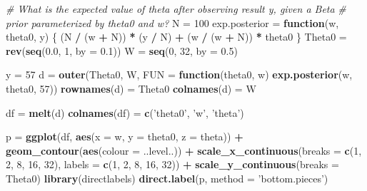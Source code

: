 \documentclass[]{article}
\newenvironment{Shaded}{\begin{snugshade}}{\end{snugshade}}
\newcommand{\CommentTok}[1]{\textcolor[rgb]{0.56,0.35,0.01}{\textit{#1}}}
\newcommand{\ControlFlowTok}[1]{\textcolor[rgb]{0.13,0.29,0.53}{\textbf{#1}}}
\newcommand{\DataTypeTok}[1]{\textcolor[rgb]{0.13,0.29,0.53}{#1}}
\newcommand{\DecValTok}[1]{\textcolor[rgb]{0.00,0.00,0.81}{#1}}
\newcommand{\FloatTok}[1]{\textcolor[rgb]{0.00,0.00,0.81}{#1}}
\newcommand{\KeywordTok}[1]{\textcolor[rgb]{0.13,0.29,0.53}{\textbf{#1}}}
\newcommand{\NormalTok}[1]{#1}
\newcommand{\OperatorTok}[1]{\textcolor[rgb]{0.81,0.36,0.00}{\textbf{#1}}}
\newcommand{\StringTok}[1]{\textcolor[rgb]{0.31,0.60,0.02}{#1}}
\begin{document}
\begin{Shaded}
\begin{Highlighting}[]
\CommentTok{# What is the expected value of theta after observing result y, given a Beta}
\CommentTok{# prior parameterized by theta0 and w?}
\NormalTok{N =}\StringTok{ }\DecValTok{100}
\NormalTok{exp.posterior =}\StringTok{ }\ControlFlowTok{function}\NormalTok{(w, theta0, y) \{}
\NormalTok{  (N }\OperatorTok{/}\StringTok{ }\NormalTok{(w }\OperatorTok{+}\StringTok{ }\NormalTok{N)) }\OperatorTok{*}\StringTok{ }\NormalTok{(y }\OperatorTok{/}\StringTok{ }\NormalTok{N) }\OperatorTok{+}\StringTok{ }\NormalTok{(w }\OperatorTok{/}\StringTok{ }\NormalTok{(w }\OperatorTok{+}\StringTok{ }\NormalTok{N)) }\OperatorTok{*}\StringTok{ }\NormalTok{theta0}
\NormalTok{\}}
\NormalTok{Theta0 =}\StringTok{ }\KeywordTok{rev}\NormalTok{(}\KeywordTok{seq}\NormalTok{(}\FloatTok{0.0}\NormalTok{, }\DecValTok{1}\NormalTok{, }\DataTypeTok{by =} \FloatTok{0.1}\NormalTok{))}
\NormalTok{W =}\StringTok{ }\KeywordTok{seq}\NormalTok{(}\DecValTok{0}\NormalTok{, }\DecValTok{32}\NormalTok{, }\DataTypeTok{by =} \FloatTok{0.5}\NormalTok{)}

\NormalTok{y =}\StringTok{ }\DecValTok{57}
\NormalTok{d =}\StringTok{ }\KeywordTok{outer}\NormalTok{(Theta0, W, }\DataTypeTok{FUN =} \ControlFlowTok{function}\NormalTok{(theta0, w) }\KeywordTok{exp.posterior}\NormalTok{(w, theta0, }\DecValTok{57}\NormalTok{))}
\KeywordTok{rownames}\NormalTok{(d) =}\StringTok{ }\NormalTok{Theta0}
\KeywordTok{colnames}\NormalTok{(d) =}\StringTok{ }\NormalTok{W}

\NormalTok{df =}\StringTok{ }\KeywordTok{melt}\NormalTok{(d)}
\KeywordTok{colnames}\NormalTok{(df) =}\StringTok{ }\KeywordTok{c}\NormalTok{(}\StringTok{'theta0'}\NormalTok{, }\StringTok{'w'}\NormalTok{, }\StringTok{'theta'}\NormalTok{)}

\NormalTok{p =}\StringTok{ }\KeywordTok{ggplot}\NormalTok{(df, }\KeywordTok{aes}\NormalTok{(}\DataTypeTok{x =}\NormalTok{ w, }\DataTypeTok{y =}\NormalTok{ theta0, }\DataTypeTok{z =}\NormalTok{ theta)) }\OperatorTok{+}
\StringTok{  }\KeywordTok{geom_contour}\NormalTok{(}\KeywordTok{aes}\NormalTok{(}\DataTypeTok{colour =}\NormalTok{ ..level..)) }\OperatorTok{+}
\StringTok{  }\KeywordTok{scale_x_continuous}\NormalTok{(}\DataTypeTok{breaks =} \KeywordTok{c}\NormalTok{(}\DecValTok{1}\NormalTok{, }\DecValTok{2}\NormalTok{, }\DecValTok{8}\NormalTok{, }\DecValTok{16}\NormalTok{, }\DecValTok{32}\NormalTok{), }\DataTypeTok{labels =} \KeywordTok{c}\NormalTok{(}\DecValTok{1}\NormalTok{, }\DecValTok{2}\NormalTok{, }\DecValTok{8}\NormalTok{, }\DecValTok{16}\NormalTok{, }\DecValTok{32}\NormalTok{)) }\OperatorTok{+}
\StringTok{  }\KeywordTok{scale_y_continuous}\NormalTok{(}\DataTypeTok{breaks =}\NormalTok{ Theta0)}
\KeywordTok{library}\NormalTok{(directlabels)}
\KeywordTok{direct.label}\NormalTok{(p, }\DataTypeTok{method =} \StringTok{'bottom.pieces'}\NormalTok{)}
\end{Highlighting}
\end{Shaded}
\end{document}
